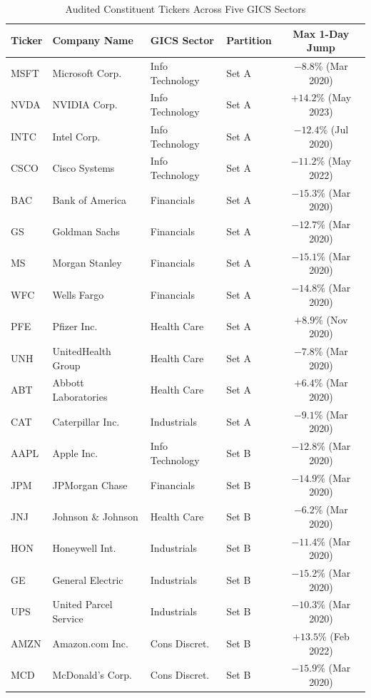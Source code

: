 \documentclass[10pt,journal]{IEEEtran}
\begin{document}
\begin{table}[htbp]
\centering
\caption{Audited Constituent Tickers Across Five GICS Sectors}
\label{tab:tickers}
\begin{tabular}{llllc}
\toprule
\textbf{Ticker} & \textbf{Company Name} & \textbf{GICS Sector} & \textbf{Partition} & \textbf{Max 1-Day Jump} \\
\midrule
MSFT & Microsoft Corp.       & Info Technology & Set A & $-8.8\%$ (Mar 2020) \\
NVDA & NVIDIA Corp.          & Info Technology & Set A & $+14.2\%$ (May 2023) \\
INTC & Intel Corp.           & Info Technology & Set A & $-12.4\%$ (Jul 2020) \\
CSCO & Cisco Systems         & Info Technology & Set A & $-11.2\%$ (May 2022) \\
BAC  & Bank of America       & Financials      & Set A & $-15.3\%$ (Mar 2020) \\
GS   & Goldman Sachs         & Financials      & Set A & $-12.7\%$ (Mar 2020) \\
MS   & Morgan Stanley        & Financials      & Set A & $-15.1\%$ (Mar 2020) \\
WFC  & Wells Fargo           & Financials      & Set A & $-14.8\%$ (Mar 2020) \\
PFE  & Pfizer Inc.           & Health Care     & Set A & $+8.9\%$ (Nov 2020) \\
UNH  & UnitedHealth Group    & Health Care     & Set A & $-7.8\%$ (Mar 2020) \\
ABT  & Abbott Laboratories   & Health Care     & Set A & $+6.4\%$ (Mar 2020) \\
CAT  & Caterpillar Inc.      & Industrials     & Set A & $-9.1\%$ (Mar 2020) \\
\midrule
AAPL & Apple Inc.            & Info Technology & Set B & $-12.8\%$ (Mar 2020) \\
JPM  & JPMorgan Chase        & Financials      & Set B & $-14.9\%$ (Mar 2020) \\
JNJ  & Johnson \& Johnson    & Health Care     & Set B & $-6.2\%$ (Mar 2020) \\
HON  & Honeywell Int.        & Industrials     & Set B & $-11.4\%$ (Mar 2020) \\
GE   & General Electric      & Industrials     & Set B & $-15.2\%$ (Mar 2020) \\
UPS  & United Parcel Service & Industrials     & Set B & $-10.3\%$ (Mar 2020) \\
AMZN & Amazon.com Inc.       & Cons Discret.   & Set B & $+13.5\%$ (Feb 2022) \\
MCD  & McDonald's Corp.      & Cons Discret.   & Set B & $-15.9\%$ (Mar 2020) \\
\bottomrule
\end{tabular}
\end{table}
\end{document}
